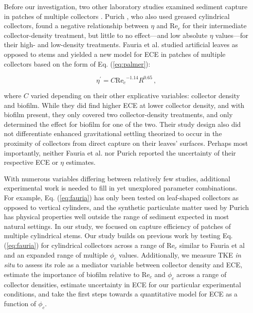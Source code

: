 \documentclass[geosciences,article,submit,moreauthors,pdftex]{Definitions/mdpi}
\newcommand\Rey{\mathrm{Re}}
\begin{document}
Before our investigation, two other laboratory studies examined sediment capture in patches of multiple collectors \cite{purich2006capture,Fauria_2015}. Purich \cite{purich2006capture}, who also used greased cylindrical collectors, found a negative relationship between $\eta$ and $\Rey_c$ for their intermediate collector-density treatment, but little to no effect---and low absolute $\eta$ values---for their high- and low-density treatments. Fauria et al. \cite{Fauria_2015} studied artificial leaves as opposed to stems and yielded a new model for ECE in patches of multiple collectors based on the form of Eq. (\ref{eq:palmer}):

\begin{equation}
    \eta^\prime=C{\Rey_c}^{-1.14}R^{0.65}\,,
    \label{eq:fauria}
\end{equation}

\noindent where $C$ varied depending on their other explicative variables: collector density and biofilm. While they did find higher ECE at lower collector density, and with biofilm present, they only covered two collector-density treatments, and only determined the effect for biofilm for one of the two. Their study design also did not differentiate enhanced gravitational settling theorized to occur in the proximity of collectors from direct capture on their leaves' surfaces. Perhaps most importantly, neither Fauria et al. nor Purich reported the uncertainty of their respective ECE or $\eta$ estimates.

With numerous variables differing between relatively few studies, additional experimental work is needed to fill in yet unexplored parameter combinations. For example, Eq. (\ref{eq:fauria}) has only been tested on leaf-shaped collectors as opposed to vertical cylinders, and the synthetic particulate matter used by Purich \cite{purich2006capture} has physical properties well outside the range of sediment expected in most natural settings. In our study, we focused on capture efficiency of patches of multiple cylindrical stems. Our study builds on previous work by testing Eq. (\ref{eq:fauria}) for cylindrical collectors across a range of $\Rey_c$ similar to Fauria et al \cite{Fauria_2015} and an expanded range of multiple $\phi_c$ values. Additionally, we measure TKE \textit{in situ} to assess its role as a mediator variable between collector density and ECE, estimate the importance of biofilm relative to $\Rey_c$ and $\phi_c$ across a range of collector densities, estimate uncertainty in ECE for our particular experimental conditions, and take the first steps towards a quantitative model for ECE as a function of $\phi_c$.
\end{document}

